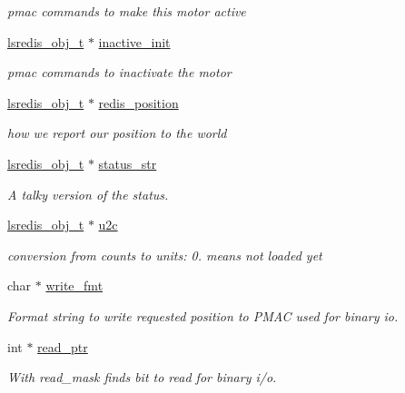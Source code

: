 \begin{DoxyCompactItemize}
\begin{DoxyCompactList}\small\item\em pmac commands to make this motor active \end{DoxyCompactList}\item 
\hyperlink{pgpmac_8h_ad449de06d02791adf2498d2a1e1f909c}{lsredis\-\_\-obj\-\_\-t} $\ast$ \hyperlink{structlspmac__motor__struct_ab329ce9b277eca9984c18417dece7bf7}{inactive\-\_\-init}
\begin{DoxyCompactList}\small\item\em pmac commands to inactivate the motor \end{DoxyCompactList}\item 
\hyperlink{pgpmac_8h_ad449de06d02791adf2498d2a1e1f909c}{lsredis\-\_\-obj\-\_\-t} $\ast$ \hyperlink{structlspmac__motor__struct_af94a0b2611136058ead4948fd7c858e3}{redis\-\_\-position}
\begin{DoxyCompactList}\small\item\em how we report our position to the world \end{DoxyCompactList}\item 
\hyperlink{pgpmac_8h_ad449de06d02791adf2498d2a1e1f909c}{lsredis\-\_\-obj\-\_\-t} $\ast$ \hyperlink{structlspmac__motor__struct_aa0a6bed8379c5b1f90a4eb826cde9136}{status\-\_\-str}
\begin{DoxyCompactList}\small\item\em A talky version of the status. \end{DoxyCompactList}\item 
\hyperlink{pgpmac_8h_ad449de06d02791adf2498d2a1e1f909c}{lsredis\-\_\-obj\-\_\-t} $\ast$ \hyperlink{structlspmac__motor__struct_a8838915ebb6f9989944117c8197d5e86}{u2c}
\begin{DoxyCompactList}\small\item\em conversion from counts to units\-: 0. means not loaded yet \end{DoxyCompactList}\item 
char $\ast$ \hyperlink{structlspmac__motor__struct_a70291ddfe7994c0bec7fc2287cb6dd89}{write\-\_\-fmt}
\begin{DoxyCompactList}\small\item\em Format string to write requested position to P\-M\-A\-C used for binary io. \end{DoxyCompactList}\item 
int $\ast$ \hyperlink{structlspmac__motor__struct_a844b28ccabab5048ca216db074fb9704}{read\-\_\-ptr}
\begin{DoxyCompactList}\small\item\em With read\-\_\-mask finds bit to read for binary i/o. \end{DoxyCompactList}\item 

\end{DoxyCompactItemize}

